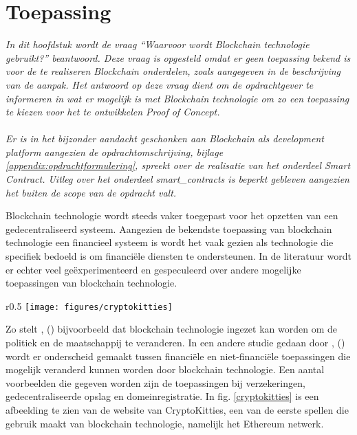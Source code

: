 \section{Toepassing}

\textit{In dit hoofdstuk wordt de vraag ``Waarvoor wordt Blockchain technologie gebruikt?'' beantwoord. Deze vraag is opgesteld omdat er geen toepassing bekend is voor de te realiseren Blockchain onderdelen, zoals aangegeven in de beschrijving van de aanpak. Het antwoord op deze vraag dient om de opdrachtgever te informeren in wat er mogelijk is met Blockchain technologie om zo een toepassing te kiezen voor het te ontwikkelen Proof of Concept. \\ \\ Er is in het bijzonder aandacht geschonken aan Blockchain als development platform aangezien de opdrachtomschrijving, bijlage \ref{appendix:opdrachtformulering}, spreekt over de realisatie van het onderdeel Smart Contract. Uitleg over het onderdeel \glspl{smart_contract} is beperkt gebleven aangezien het buiten de scope van de opdracht valt.
}

Blockchain technologie wordt steeds vaker toegepast voor het opzetten van een gedecentraliseerd systeem. Aangezien de bekendste toepassing van blockchain technologie een financieel systeem is wordt het vaak gezien als technologie die specifiek bedoeld is om financiële diensten te ondersteunen. In de literatuur wordt er echter veel geëxperimenteerd en gespeculeerd over andere mogelijke toepassingen van blockchain technologie.

\begin{wrapfigure}{r}{0.5\textwidth}
  \texttt{[image: figures/cryptokitties]}
  \caption{CryptoKitties, een spel dat gebruik maakt van Blockchain technologie.}
  \label{cryptokitties}
\end{wrapfigure}

Zo stelt \citeauthor{atzori2015blockchain}, (\citeyear{atzori2015blockchain}) bijvoorbeeld dat blockchain technologie ingezet kan worden om de politiek en de maatschappij te veranderen. In een andere studie gedaan door \citeauthor{crosby2016blockchain}, (\citeyear{crosby2016blockchain}) wordt er onderscheid gemaakt tussen financiële en niet-financiële toepassingen die mogelijk veranderd kunnen worden door blockchain technologie. Een aantal voorbeelden die gegeven worden zijn de toepassingen bij verzekeringen, gedecentraliseerde opslag en domeinregistratie. In fig. \ref{cryptokitties} is een afbeelding te zien van de website van CryptoKitties, een van de eerste spellen die gebruik maakt van blockchain technologie, namelijk het Ethereum netwerk.

